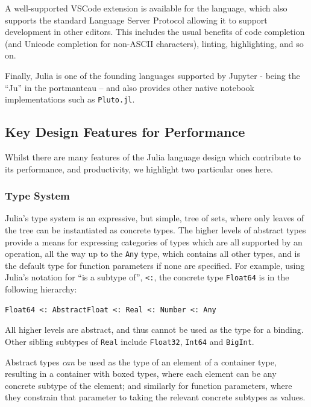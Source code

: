 \documentclass{webofc}
\begin{document}
A well-supported VSCode extension is available for the language, which also
supports the standard Language Server Protocol allowing it to support development in other editors.
This includes the usual benefits of code completion (and Unicode completion for
non-ASCII characters), linting, highlighting, and so on.

Finally, Julia is one of the founding languages supported by Jupyter - being the
``Ju'' in the portmanteau -- and also provides other native notebook
implementations such as \texttt{Pluto.jl}. 

\subsection{Key Design Features for Performance}

Whilst there are many features of the Julia language design which contribute to its 
performance, and productivity, we highlight two particular ones here.

\subsubsection{Type System}
\label{sec:juliatypes}

Julia's type system is an expressive, but simple, tree of sets, where only leaves
of the tree can be instantiated as concrete types. The higher levels of abstract
types provide a means for expressing categories of types which are all supported
by an operation, all the way up to the \verb$Any$ type, which contains all other
types, and is the default type for function parameters if none are specified.
For example, using Julia's notation for ``is a subtype of'', \texttt{<:}, the concrete type
\verb$Float64$ is in the following hierarchy:

\begin{verbatim}
Float64 <: AbstractFloat <: Real <: Number <: Any
\end{verbatim}

All higher levels are abstract, and thus cannot be used as the type for a
binding. Other sibling subtypes of \verb$Real$ include \verb$Float32$,
\verb$Int64$ and \verb$BigInt$.

Abstract types \textit{can} be used as the type of an element of a container
type, resulting in a container with boxed types, where each element can be any
concrete subtype of the element; and similarly for function parameters, where
they constrain that parameter to taking the relevant concrete subtypes as
values. 
\end{document}
